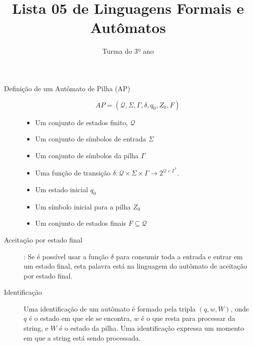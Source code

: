 \documentclass[12pt]{article}
\title{Lista 05 de Linguagens Formais e Autômatos}
\date{}
\author{Turma do 3º ano}
\def\cQ{\mathcal{Q}}
\begin{document}
 

\maketitle

\begin{description}


\item[Definição de um Autômato de Pilha (AP)]
\[AP = (\cQ, \Sigma, \Gamma, \delta, q_0, Z_0, F)\]
\begin{itemize}
\item Um conjunto de estados finito, $\cQ$
\item Um conjunto de símbolos de entrada $\Sigma$
\item Um conjunto de símbolos da pilha $\Gamma$
\item Uma função de transição $\delta: \cQ\times\Sigma\times\Gamma\rightarrow 2^{\cQ\times \Gamma^*}$.
\item Um estado inicial $q_0$
\item Um símbolo inicial para a pilha $Z_0$
\item Um conjunto de estados finais $F\subseteq \cQ$
\end{itemize}


\item[Aceitação por estado final]: Se é possível usar a função $\delta$ para consumir toda a entrada e entrar em um estado final, esta palavra está na linguagem do autômato de aceitação por estado final.


\item[Identificação] Uma identificação de um autômato é formado pela tripla $(q,w,W)$, onde $q$ é o estado em que ele se encontra, $w$ é o que resta para processar da string, e $W$ é o estado da pilha.
Uma identificação expressa um momento em que a string está sendo processada.



\end{description}

\vspace{3em}
\end{document}
